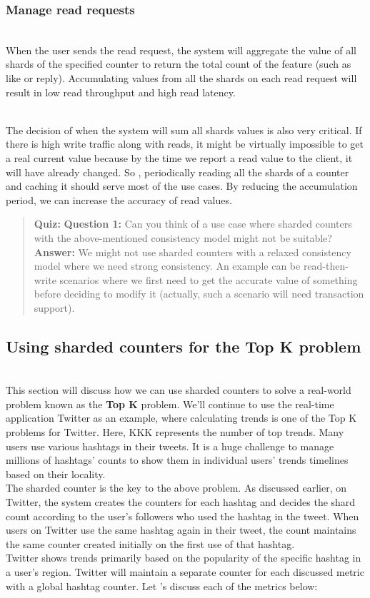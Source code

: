 \subsubsection{Manage read requests}\label{xh5-tIhkiJt8BBx_Fw4fW}
\\
When the user sends the read request, the system will aggregate the value of all shards of the specified counter to return the total count of the feature (such as like or reply). Accumulating values from all the shards on each read request will result in low read throughput and high read latency.\\
\strut \\
The decision of when the system will sum all shards values is also very critical. If there is high write traffic along with reads, it might be virtually impossible to get a real current value because by the time we report a read value to the client, it will have already changed. So , periodically reading all the shards of a counter and caching it should serve most of the use cases. By reducing the accumulation period, we can increase the accuracy of read values.

\begin{quote}
\textbf{Quiz:}
\textbf{Question 1:} Can you think of a use case where sharded counters with the above-mentioned consistency model might not be suitable?
\textbf{Answer:} We might not use sharded counters with a relaxed consistency model where we need strong consistency. An example can be read-then-write scenarios where we first need to get the accurate value of something before deciding to modify it (actually, such a scenario will need transaction support).
\end{quote}

\subsection{Using sharded counters for the Top K problem}\label{PMgs6Ojm-04tA_xtNnXB6}
\\
This section will discuss how we can use sharded counters to solve a real-world problem known as the \textbf{Top K} problem. We'll continue to use the real-time application Twitter as an example, where calculating trends is one of the Top K problems for Twitter. Here, KKK represents the number of top trends. Many users use various hashtags in their tweets. It is a huge challenge to manage millions of hashtags' counts to show them in individual users' trends timelines based on their locality.
\\
The sharded counter is the key to the above problem. As discussed earlier, on Twitter, the system creates the counters for each hashtag and decides the shard count according to the user's followers who used the hashtag in the tweet. When users on Twitter use the same hashtag again in their tweet, the count maintains the same counter created initially on the first use of that hashtag.
\\
Twitter shows trends primarily based on the popularity of the specific hashtag in a user's region. Twitter will maintain a separate counter for each discussed metric with a global hashtag counter. Let 's discuss each of the metrics below:

